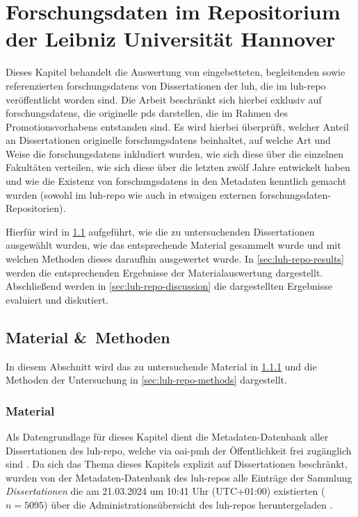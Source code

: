 \chapter{Forschungsdaten im Repositorium der Leibniz Universität Hannover}\label{ch:luh-repo}
Dieses Kapitel behandelt die Auswertung von eingebetteten, begleitenden sowie referenzierten \glspl{forschungsdaten} von Dissertationen der \gls{luh}, die im \gls{luh-repo} veröffentlicht worden sind.
Die Arbeit beschränkt sich hierbei exklusiv auf \glspl{forschungsdaten}, die originelle \glspl{pd} darstellen, die im Rahmen des Promotionsvorhabens entstanden sind.
Es wird hierbei überprüft, welcher Anteil an Dissertationen originelle \glspl{forschungsdaten} beinhaltet, auf welche Art und Weise die \glspl{forschungsdaten} inkludiert wurden, wie sich diese über die einzelnen Fakultäten verteilen, wie sich diese über die letzten zwölf Jahre entwickelt haben und wie die Existenz von \glspl{forschungsdaten} in den Metadaten kenntlich gemacht wurden (sowohl im \gls{luh-repo} wie auch in etwaigen externen \gls{forschungsdaten}-Repositorien).

Hierfür wird in \cref{sec:luh-repo-material-methods} aufgeführt, wie die zu untersuchenden Dissertationen ausgewählt wurden, wie das entsprechende Material gesammelt wurde und mit welchen Methoden dieses daraufhin ausgewertet wurde.
In \cref{sec:luh-repo-results} werden die entsprechenden Ergebnisse der Materialauswertung dargestellt.
Abschließend werden in \cref{sec:luh-repo-discussion} die dargestellten Ergebnisse evaluiert und diskutiert.

\section{Material \&\ Methoden}\label{sec:luh-repo-material-methods}
In diesem Abschnitt wird das zu untersuchende Material in \cref{sec:luh-repo-material} und die Methoden der Untersuchung in \cref{sec:luh-repo-methods} dargestellt.

\subsection{Material}\label{sec:luh-repo-material}
Als Datengrundlage für dieses Kapitel dient die Metadaten-Datenbank aller Dissertationen des \gls{luh-repo}, welche via \gls{oai-pmh} der Öffentlichkeit frei zugänglich sind \autocite{luh-repo}.
Da sich das Thema dieses Kapitels explizit auf Dissertationen beschränkt, wurden von der Metadaten-Datenbank des \gls{luh-repo}s alle Einträge der Sammlung \textit{Dissertationen} die am 21.03.2024 um 10:41 Uhr (UTC+01:00) existierten ($n=5095$) über die Administrationsübersicht des \gls{luh-repo}s heruntergeladen \autocite{my-dataset}.

